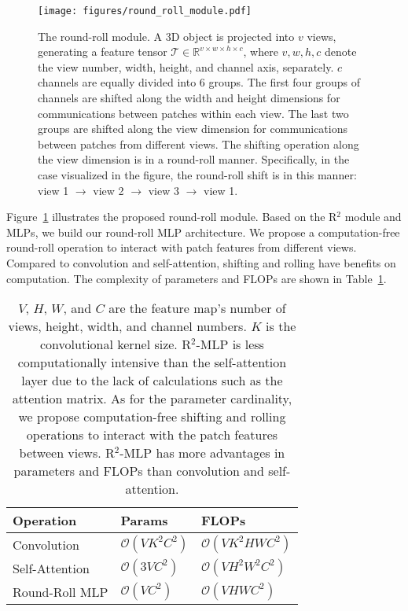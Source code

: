 \documentclass[11pt]{article}
\begin{document}
\newpage


\begin{figure}[ht]
\centering
\texttt{[image: figures/round\_roll\_module.pdf]}

\vspace{0.1in}

\caption{
The round-roll module. A 3D object is projected into $v$ views, generating a feature tensor $\bm{\mathcal{T}} \in \mathbb{R}^{v \times w \times h \times c}$, where $v, w, h, c$ denote the view number, width, height, and channel axis, separately. $c$ channels are equally divided into $6$ groups. The first four groups of channels are shifted along the width and height dimensions for communications between patches within each view. The last two groups are shifted along the view dimension for communications between patches from different views. The shifting operation along the view dimension is in a round-roll manner. Specifically, in the case visualized in the figure, the round-roll shift is in this manner: view 1 $\to$ view 2 $\to$ view 3 $\to$ view 1.
}\label{fig:roll}\vspace{0.2in}
\end{figure}

Figure~\ref{fig:roll}  illustrates the proposed round-roll module. Based on the R$^2$ module and MLPs,  we build our round-roll MLP architecture.
We propose a computation-free round-roll operation to interact with patch features from different views.
Compared to convolution and self-attention, shifting and rolling have benefits on computation. The complexity of parameters and FLOPs are shown in Table~\ref{tab:complexity}.


\vspace{0.4in}


\begin{table}[h!]
\caption{
$V$, $H$, $W$, and $C$ are the feature map's number of views, height, width, and channel numbers. $K$ is the convolutional kernel size.
R$^2$-MLP is less computationally intensive than the self-attention layer due to the lack of calculations such as the attention matrix. As for the parameter cardinality, we propose computation-free shifting and rolling operations to interact with the patch features between views.
R$^2$-MLP has more advantages in parameters and FLOPs than convolution and self-attention.
}
\label{tab:complexity}
\centering
\begin{tabular}{lll}
\toprule
Operation & Params & FLOPs \\
\midrule
Convolution & $\mathcal{O}(V K^2 C^2)$ & $\mathcal{O}(V K^2 H W C^2)$ \\
Self-Attention & $\mathcal{O}(3 V C^2)$ & $\mathcal{O}(V H^2 W^2 C^2)$ \\
Round-Roll MLP & $\mathcal{O}(V C^2)$ & $\mathcal{O}(V H W C^2)$\\
\bottomrule
\end{tabular}
\end{table}
\end{document}
